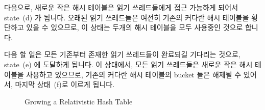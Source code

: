 다음으로, 새로운 작은 해시 테이블은 읽기 쓰레드들에게 접근 가능하게 되어서
state~(d) 가 됩니다.
오래된 읽기 쓰레드들은 여전히 기존의 커다란 해시 테이블을 횡단하고 있을 수
있으므로, 이 상태는 두개의 해시 테이블을 모두 사용중인 것으로 합니다.

다음 할 일은 모든 기존부터 존재한 읽기 쓰레드들이 완료되길 기다리는 것으로,
state~(e) 에 도달하게 됩니다.
이 상태에서, 모든 읽기 쓰레드들은 새로운 작은 해시 테이블을 사용하고 있으므로,
기존의 커다란 해시 테이블의 bucket 들은 해제될 수 있어서, 마지막 상태~(f)로
이르게 됩니다.

\begin{figure}[tb]
\centering
{}
\caption{Growing a Relativistic Hash Table}
\label{fig:datastruct:Growing a Relativistic Hash Table}
\end{figure}

